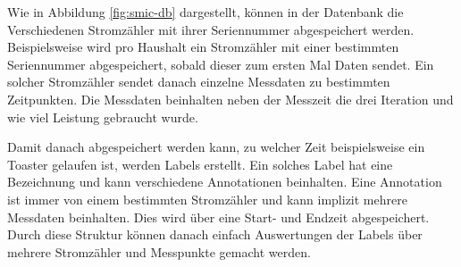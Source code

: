Wie in Abbildung \ref{fig:smic-db} dargestellt, können in der Datenbank
die Verschiedenen Stromzähler mit ihrer Seriennummer abgespeichert werden.
Beispielsweise wird pro Haushalt ein Stromzähler mit einer bestimmten
Seriennummer abgespeichert, sobald dieser zum ersten Mal Daten sendet.
Ein solcher Stromzähler sendet danach einzelne Messdaten zu bestimmten
Zeitpunkten. Die Messdaten beinhalten neben der Messzeit die drei Iteration
und wie viel Leistung gebraucht wurde.

Damit danach abgespeichert werden kann, zu welcher Zeit beispielsweise ein
Toaster gelaufen ist, werden Labels erstellt. Ein solches Label hat eine
Bezeichnung und kann verschiedene Annotationen beinhalten.
Eine Annotation ist immer von einem bestimmten Stromzähler und kann implizit mehrere
Messdaten beinhalten. Dies wird über eine Start- und Endzeit abgespeichert.
Durch diese Struktur können danach einfach Auswertungen der Labels über mehrere
Stromzähler und Messpunkte gemacht werden.


